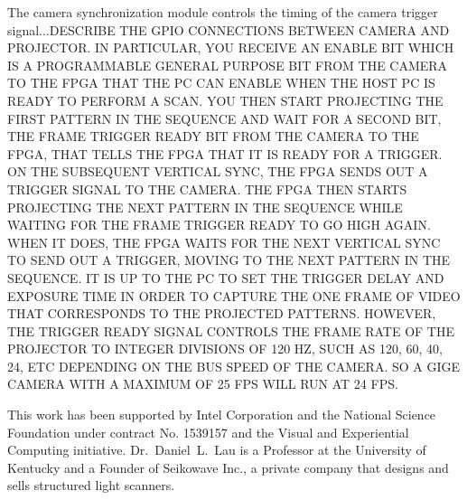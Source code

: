 \documentclass[]{spie}  %
\begin{document}
The camera synchronization module controls the timing of the camera trigger signal...DESCRIBE THE GPIO CONNECTIONS BETWEEN CAMERA AND PROJECTOR.  IN PARTICULAR, YOU RECEIVE AN ENABLE BIT WHICH IS A PROGRAMMABLE GENERAL PURPOSE BIT FROM THE CAMERA TO THE FPGA THAT THE PC CAN ENABLE WHEN THE HOST PC IS READY TO PERFORM A SCAN.  YOU THEN START PROJECTING THE FIRST PATTERN IN THE SEQUENCE AND WAIT FOR A SECOND BIT, THE FRAME TRIGGER READY BIT FROM THE CAMERA TO THE FPGA, THAT TELLS THE FPGA THAT IT IS READY FOR A TRIGGER.  ON THE SUBSEQUENT VERTICAL SYNC, THE FPGA SENDS OUT A TRIGGER SIGNAL TO THE CAMERA.  THE FPGA THEN STARTS PROJECTING THE NEXT PATTERN IN THE SEQUENCE WHILE WAITING FOR THE FRAME TRIGGER READY TO GO HIGH AGAIN.  WHEN IT DOES, THE FPGA WAITS FOR THE NEXT VERTICAL SYNC TO SEND OUT A TRIGGER, MOVING TO THE NEXT PATTERN IN THE SEQUENCE.  IT IS UP TO THE PC TO SET THE TRIGGER DELAY AND EXPOSURE TIME IN ORDER TO CAPTURE THE ONE FRAME OF VIDEO THAT CORRESPONDS TO THE PROJECTED PATTERNS.  HOWEVER, THE TRIGGER READY SIGNAL CONTROLS THE FRAME RATE OF THE PROJECTOR TO INTEGER DIVISIONS OF 120 HZ, SUCH AS 120, 60, 40, 24, ETC DEPENDING ON THE BUS SPEED OF THE CAMERA.  SO A GIGE CAMERA WITH A MAXIMUM OF 25 FPS WILL RUN AT 24 FPS. 






\acknowledgments
This work has been supported by Intel Corporation and the National Science Foundation under contract No. 1539157 and the Visual and Experiential Computing initiative. Dr.~Daniel~L.~Lau is a Professor at the University of Kentucky and a Founder of Seikowave Inc., a private company that designs and sells structured light scanners.

\end{document}
